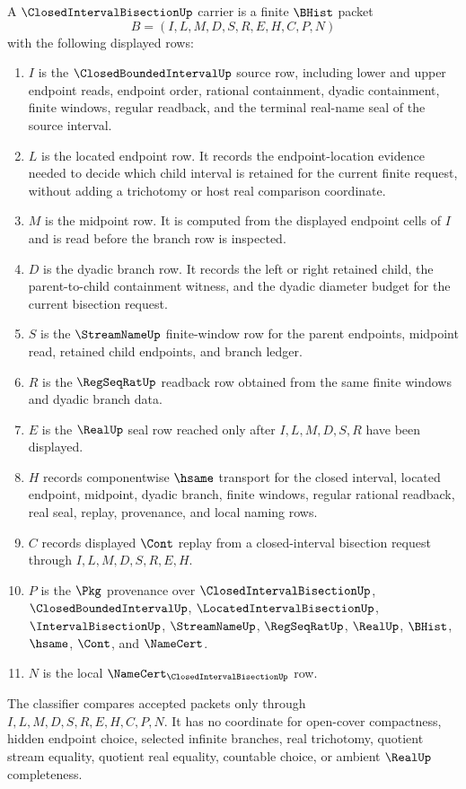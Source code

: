\begin{definition}
\label{def:closed-interval-bisection-carrier}
A $\ClosedIntervalBisectionUp$ carrier is a finite $\BHist$ packet
$$
B=(I,L,M,D,S,R,E,H,C,P,N)
$$
with the following displayed rows:
\begin{enumerate}
\item $I$ is the $\ClosedBoundedIntervalUp$ source row, including lower and upper endpoint reads, endpoint order, rational containment, dyadic containment, finite windows, regular readback, and the terminal real-name seal of the source interval.
\item $L$ is the located endpoint row. It records the endpoint-location evidence needed to decide which child interval is retained for the current finite request, without adding a trichotomy or host real comparison coordinate.
\item $M$ is the midpoint row. It is computed from the displayed endpoint cells of $I$ and is read before the branch row is inspected.
\item $D$ is the dyadic branch row. It records the left or right retained child, the parent-to-child containment witness, and the dyadic diameter budget for the current bisection request.
\item $S$ is the $\StreamNameUp$ finite-window row for the parent endpoints, midpoint read, retained child endpoints, and branch ledger.
\item $R$ is the $\RegSeqRatUp$ readback row obtained from the same finite windows and dyadic branch data.
\item $E$ is the $\RealUp$ seal row reached only after $I,L,M,D,S,R$ have been displayed.
\item $H$ records componentwise $\hsame$ transport for the closed interval, located endpoint, midpoint, dyadic branch, finite windows, regular rational readback, real seal, replay, provenance, and local naming rows.
\item $C$ records displayed $\Cont$ replay from a closed-interval bisection request through $I,L,M,D,S,R,E,H$.
\item $P$ is the $\Pkg$ provenance over $\ClosedIntervalBisectionUp$, $\ClosedBoundedIntervalUp$, $\LocatedIntervalBisectionUp$, $\IntervalBisectionUp$, $\StreamNameUp$, $\RegSeqRatUp$, $\RealUp$, $\BHist$, $\hsame$, $\Cont$, and $\NameCert$.
\item $N$ is the local $\NameCert_{\ClosedIntervalBisectionUp}$ row.
\end{enumerate}
The classifier compares accepted packets only through $I,L,M,D,S,R,E,H,C,P,N$. It has no coordinate for open-cover compactness, hidden endpoint choice, selected infinite branches, real trichotomy, quotient stream equality, quotient real equality, countable choice, or ambient $\RealUp$ completeness.
\end{definition}

